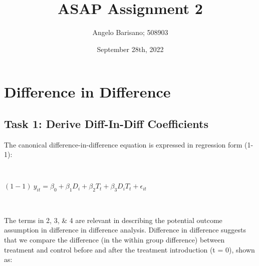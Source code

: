 \documentclass[a4paper]{article}
\begin{document}
\title{ASAP Assignment 2}
\author{Angelo Barisano; 508903 }
\date{September 28th, 2022}
\maketitle

\newpage
\section{Difference in Difference}






\subsection{Task 1: Derive Diff-In-Diff Coefficients}

The canonical difference-in-difference equation is expressed in regression form (1-1): 

\

$(1-1) \ {y_{it}} = \beta_{0} + \beta_{1} D_i + \beta_{2} T_t+ \beta_{3} D_i T_t + \epsilon_{it}$

\

%


The terms in 2, 3, \& 4 are relevant in describing the potential outcome assumption in difference in difference analysis. Difference in difference suggests that we compare the difference (in the within group difference) between treatment and control before and after the treatment introduction (t = 0), shown as:
\end{document}
